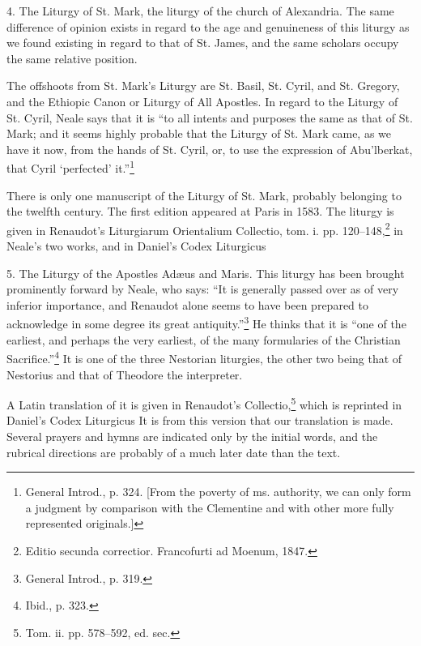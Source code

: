 4. The Liturgy of St. Mark, the liturgy of the church of Alexandria. The same difference of opinion exists in regard to the age and genuineness of this liturgy as we found existing in regard to that of St. James, and the same scholars occupy the same relative position.

The offshoots from St. Mark’s Liturgy are St. Basil, St. Cyril, and St. Gregory, and the Ethiopic Canon or Liturgy of All Apostles. In regard to the Liturgy of St. Cyril, Neale says that it is “to all intents and purposes the same as that of St. Mark; and it seems highly probable that the Liturgy of St. Mark came, as we have it now, from the hands of St. Cyril, or, to use the expression of Abu’lberkat, that Cyril ‘perfected’ it.”\footnote{\par  General Introd., p. 324. [From the poverty of ms. authority, we can only form a judgment by comparison with the Clementine and with other more fully represented originals.]}

There is only one manuscript of the Liturgy of St. Mark, probably belonging to the twelfth century. The first edition appeared at Paris in 1583. The liturgy is given in Renaudot’s Liturgiarum Orientalium Collectio, tom. i. pp. 120–148,\footnote{\par  Editio secunda correctior. Francofurti ad Moenum, 1847.} in Neale’s two works, and in Daniel’s Codex Liturgicus

5. The Liturgy of the Apostles Adæus and Maris. This liturgy has been brought prominently forward by Neale, who says: “It is generally passed over as of very inferior importance, and Renaudot alone seems to have been prepared to acknowledge in some degree its great antiquity.”\footnote{\par  General Introd., p. 319.} He thinks that it is “one of the earliest, and perhaps the very earliest, of the many formularies of the Christian Sacrifice.”\footnote{\par  Ibid., p. 323.} It is one of the three Nestorian liturgies, the other two being that of Nestorius and that of Theodore the interpreter.

A Latin translation of it is given in Renaudot’s Collectio,\footnote{\par  Tom. ii. pp. 578–592, ed. sec.} which is reprinted in Daniel’s Codex Liturgicus It is from this version that our translation is made. Several prayers and hymns are indicated only by the initial words, and the rubrical directions are probably of a much later date than the text.

